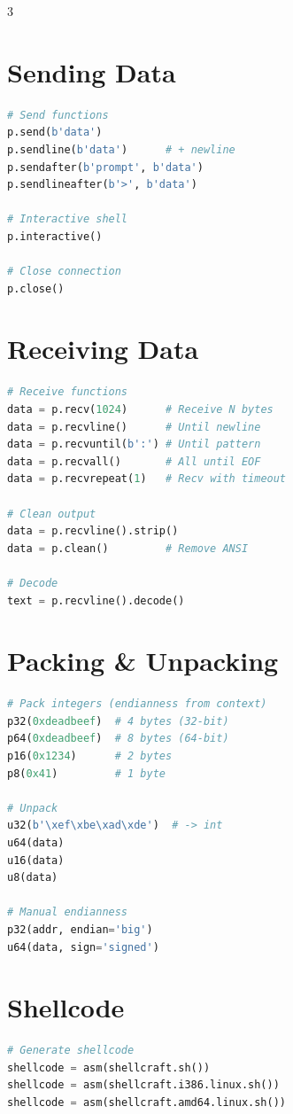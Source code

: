 \documentclass[10pt,landscape,a4paper]{article}
\begin{document}
\begin{multicols}{3}
\section*{Sending Data}
\begin{lstlisting}[language=Python]
# Send functions
p.send(b'data')
p.sendline(b'data')      # + newline
p.sendafter(b'prompt', b'data')
p.sendlineafter(b'>', b'data')

# Interactive shell
p.interactive()

# Close connection
p.close()
\end{lstlisting}

\section*{Receiving Data}
\begin{lstlisting}[language=Python]
# Receive functions
data = p.recv(1024)      # Receive N bytes
data = p.recvline()      # Until newline
data = p.recvuntil(b':') # Until pattern
data = p.recvall()       # All until EOF
data = p.recvrepeat(1)   # Recv with timeout

# Clean output
data = p.recvline().strip()
data = p.clean()         # Remove ANSI

# Decode
text = p.recvline().decode()
\end{lstlisting}

\section*{Packing \& Unpacking}
\begin{lstlisting}[language=Python]
# Pack integers (endianness from context)
p32(0xdeadbeef)  # 4 bytes (32-bit)
p64(0xdeadbeef)  # 8 bytes (64-bit)
p16(0x1234)      # 2 bytes
p8(0x41)         # 1 byte

# Unpack
u32(b'\xef\xbe\xad\xde')  # -> int
u64(data)
u16(data)
u8(data)

# Manual endianness
p32(addr, endian='big')
u64(data, sign='signed')
\end{lstlisting}

\section*{Shellcode}
\begin{lstlisting}[language=Python]
# Generate shellcode
shellcode = asm(shellcraft.sh())
shellcode = asm(shellcraft.i386.linux.sh())
shellcode = asm(shellcraft.amd64.linux.sh())


\end{lstlisting}
\end{multicols}
\end{document}
